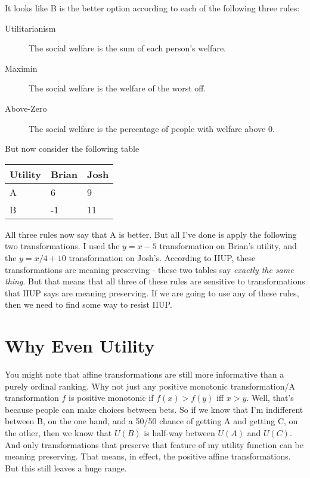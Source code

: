 It looks like B is the better option according to each of the following three rules:

\begin{description}
\item[Utilitarianism]

The social welfare is the sum of each person's welfare.

\item[Maximin]

The social welfare is the welfare of the worst off.

\item[Above-Zero]

The social welfare is the percentage of people with welfare above 0.
\end{description}
But now consider the following table

\begin{table}[htbp]
\begin{minipage}{\linewidth}
\setlength{\tymax}{0.5\linewidth}
\centering
\small
\begin{tabulary}{\textwidth}{@{}lll@{}} \toprule
 Utility & Brian & Josh \\
\midrule

 A & 6 & 9 \\
 B & -1 & 11 \\
\bottomrule

\end{tabulary}
\end{minipage}
\end{table}

All three rules now say that A is better. But all I've done is apply the following two transformations. I used the $y = x - 5$ transformation on Brian's utility, and the $y = x/4 + 10$ transformation on Josh's. According to IIUP, these transformations are meaning preserving - these two tables say \emph{exactly the same thing}. But that means that all three of these rules are sensitive to transformations that IIUP says are meaning preserving. If we are going to use any of these rules, then we need to find some way to resist IIUP.

\section{Why Even Utility}
\label{whyevenutility}

You might note that affine transformations are still more informative than a purely ordinal ranking. Why not just any positive monotonic transformation\slash  A transformation $f$ is positive monotonic if $f(x) > f(y)$ iff $x > y$. Well, that's because people can make choices between bets. So if we know that I'm indifferent between B, on the one hand, and a 50\slash 50 chance of getting A and getting C, on the other, then we know that $U(B)$ is half-way between $U(A)$ and $U(C)$. And only transformations that preserve that feature of my utility function can be meaning preserving. That means, in effect, the positive affine transformations. But this still leaves a huge range.

